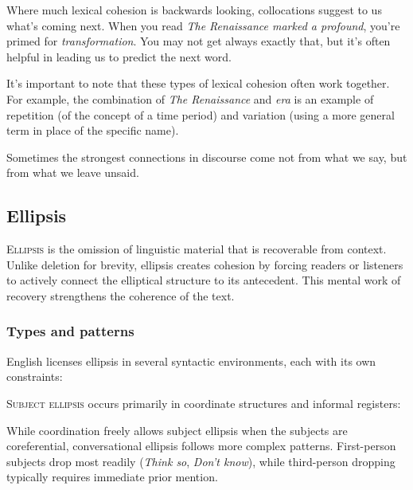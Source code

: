 Where much lexical cohesion is backwards looking, collocations suggest to us what's coming next. When you read \textit{The Renaissance marked a profound}, you're primed for \textit{transformation}. You may not get always exactly that, but it's often helpful in leading us to predict the next word.

\bigskip

It's important to note that these types of lexical cohesion often work together. For example, the combination of \textit{\textcolor{xGreen}{The Renaissance}} and \textit{\textcolor{xGreen}{era}} is an example of repetition (of the concept of a time period) and variation (using a more general term in place of the specific name).

Sometimes the strongest connections in discourse come not from what we say, but from what we leave unsaid.

\subsection{Ellipsis}\label{sec:ellipsis}

\textsc{Ellipsis} is the omission of linguistic material that is recoverable from context. Unlike deletion for brevity, ellipsis creates cohesion by forcing readers or listeners to actively connect the elliptical structure to its antecedent. This mental work of recovery strengthens the coherence of the text.

\subsubsection*{Types and patterns}

English licenses ellipsis in several syntactic environments, each with its own constraints:

\textsc{Subject ellipsis} occurs primarily in coordinate structures and informal registers:

\ea
{}
\z
\z
While coordination freely allows subject ellipsis when the subjects are coreferential, conversational ellipsis follows more complex patterns. First-person subjects drop most readily (\textit{Think so}, \textit{Don't know}), while third-person dropping typically requires immediate prior mention.

